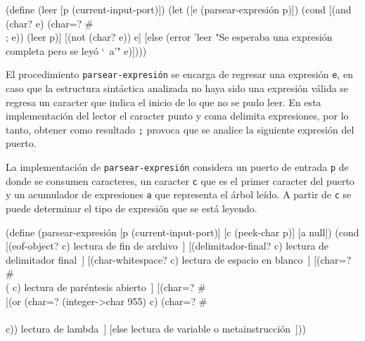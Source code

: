 \documentclass[letterpaper,twoside,openright,11pt]{book}
\begin{document}
\nwenddocs{}\endmoddef
(define (leer [p (current-input-port)])
  (let ([e (parsear-expresión p)])
    (cond
     [(and (char? e) (char=? #\\; e))
      (leer p)]
     [(not (char? e))
      e]
     [else
      (error 'leer "Se esperaba una expresión completa pero se leyó `~a'" e)])))

\eatline
{}\nwendcode{}\nwdocspar

El procedimiento {\tt{}\protect{}parsear-expresión} se encarga de regresar una expresión {\tt{}e}, en caso que la estructura sintáctica analizada no haya sido una expresión válida se regresa un caracter que indica el inicio de lo que no se pudo leer. En esta implementación del lector el caracter punto y coma delimita expresiones, por lo tanto, obtener como resultado {\tt{}{}{};} provoca que se analice la siguiente expresión del puerto.

La implementación de {\tt{}\protect{}parsear-expresión} considera un puerto de entrada {\tt{}p} de donde se consumen caracteres, un caracter {\tt{}c} que es el primer caracter del puerto y un acumulador de expresiones {\tt{}a} que representa el árbol leído. A partir de {\tt{}c} se puede determinar el tipo de expresión que se está leyendo.


\nwenddocs{}\plusendmoddef
(define (parsear-expresión [p (current-input-port)]
                           [c (peek-char p)]
                           [a null])
  (cond
   [(eof-object? c)
    \LA{}lectura de fin de archivo~{\nwtagstyle{}}\RA{}]
   [(delimitador-final? c)
    \LA{}lectura de delimitador final~{\nwtagstyle{}}\RA{}]
   [(char-whitespace? c)
    \LA{}lectura de espacio en blanco~{\nwtagstyle{}}\RA{}]
   [(char=? #\\( c)
    \LA{}lectura de paréntesis abierto~{\nwtagstyle{}}\RA{}]
   [(char=? #\\[ c)
    \LA{}lectura de hueco~{\nwtagstyle{}\subpageref{NWlam9-lecG-1}}\RA{}]
   [(or (char=? (integer->char 955) c)
        (char=? #\\\\ c))
    \LA{}lectura de lambda~{\nwtagstyle{}}\RA{}]
   [else
    \LA{}lectura de variable o metainstrucción~{\nwtagstyle{}}\RA{}]))
\end{document}
